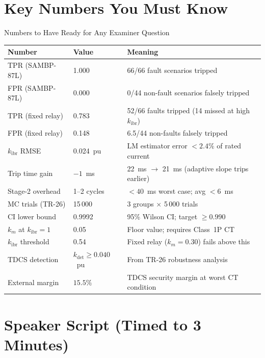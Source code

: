 \documentclass[12pt,a4paper]{article}
\newcommand{\kibr}{k_\mathrm{ibr}}
\begin{document}
\section{Key Numbers You Must Know}

\begin{formulabox}{Numbers to Have Ready for Any Examiner Question}
\begin{center}
\begin{tabular}{@{}lll@{}}
\toprule
\textbf{Number} & \textbf{Value} & \textbf{Meaning} \\
\midrule
TPR (SAMBP-87L)     & 1.000    & 66/66 fault scenarios tripped \\
FPR (SAMBP-87L)     & 0.000    & 0/44 non-fault scenarios falsely tripped \\
TPR (fixed relay)   & 0.783    & 52/66 faults tripped (14 missed at high $\kibr$) \\
FPR (fixed relay)   & 0.148    & 6.5/44 non-faults falsely tripped \\
$\kibr$ RMSE        & 0.024~pu & LM estimator error $< 2.4\%$ of rated current \\
Trip time gain      & $-1$~ms  & 22~ms $\to$ 21~ms (adaptive slope trips earlier) \\
Stage-2 overhead    & 1--2 cycles & $< 40$~ms worst case; avg $< 6$~ms \\
MC trials (TR-26)   & 15\,000  & 3 groups $\times$ 5\,000 trials \\
CI lower bound      & 0.9992   & 95\% Wilson CI; target $\geq 0.990$ \\
$k_m$ at $\kibr=1$  & 0.05     & Floor value; requires Class~1P CT \\
$\kibr$ threshold   & 0.54     & Fixed relay ($k_m=0.30$) fails above this \\
TDCS detection      & $k_\mathrm{det} \geq 0.040$~pu & From TR-26 robustness analysis \\
External margin     & $15.5\%$ & TDCS security margin at worst CT condition \\
\bottomrule
\end{tabular}
\end{center}
\end{formulabox}

\section{Speaker Script (Timed to 3 Minutes)}
\end{document}
